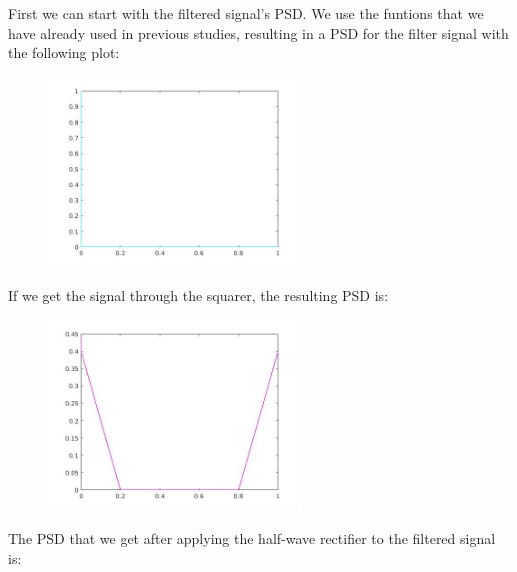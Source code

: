 \documentclass[a4paper,11pt]{article}
\begin{document}
First we can start with the filtered signal's PSD. We use the funtions that we have already used in previous studies, resulting in a PSD for the filter signal with the following plot:

\begin{figure}[!hp]
    \begin{center}
    \includegraphics[width=0.6\textwidth]{images/lab1_15.jpg}
    \end{center}
\end{figure}

If we get the signal through the squarer, the resulting PSD is:

\begin{figure}[!hp]
    \begin{center}
    \includegraphics[width=0.6\textwidth]{images/lab3_7.jpg}
    \end{center}
\end{figure}

\newpage

The PSD that we get after applying the half-wave rectifier to the filtered signal is:
\end{document}
